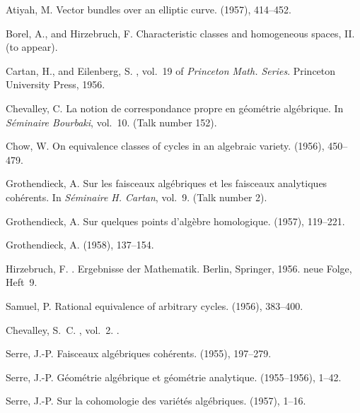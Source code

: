 \documentclass{article}
\theoremstyle{plain}
\theoremstyle{definition}
\begin{document}
\begin{thebibliography}{10}

  {\sc Atiyah, M.}
  \newblock Vector bundles over an elliptic curve.
   (1957), 414--452.

  {\sc Borel, A., and Hirzebruch, F.}
  \newblock Characteristic classes and homogeneous spaces, {II}.
   (to appear).

  {\sc Cartan, H., and Eilenberg, S.}
  , vol.~19 of {\em Princeton Math. Series}.
  \newblock Princeton University Press, 1956.

  {\sc Chevalley, C.}
  \newblock La notion de correspondance propre en g\'{e}om\'{e}trie alg\'{e}brique.
  \newblock In {\em S\'{e}minaire Bourbaki}, vol.~10.
  \newblock (Talk number 152).

  {\sc Chow, W.}
  \newblock On equivalence classes of cycles in an algebraic variety.
   (1956), 450--479.

  {\sc Grothendieck, A.}
  \newblock Sur les faisceaux alg\'{e}briques et les faisceaux analytiques
    coh\'{e}rents.
  \newblock In {\em S\'{e}minaire H. Cartan}, vol.~9.
  \newblock (Talk number 2).

  {\sc Grothendieck, A.}
  \newblock Sur quelques points d'alg\`{e}bre homologique.
   (1957), 119--221.

  {\sc Grothendieck, A.}
   (1958), 137--154.

  {\sc Hirzebruch, F.}
  .
  \newblock Ergebnisse der Mathematik. Berlin, Springer, 1956.
  \newblock neue Folge, Heft~9.

  {\sc Samuel, P.}
  \newblock Rational equivalence of arbitrary cycles.
   (1956), 383--400.

  {\sc Chevalley, S.~C.}
  , vol.~2.
  .

  {\sc Serre, J.-P.}
  \newblock Faisceaux alg\'{e}briques coh\'{e}rents.
   (1955), 197--279.

  {\sc Serre, J.-P.}
  \newblock G\'{e}om\'{e}trie alg\'{e}brique et g\'{e}om\'{e}trie analytique.
   (1955--1956), 1--42.

  {\sc Serre, J.-P.}
  \newblock Sur la cohomologie des vari\'{e}t\'{e}s alg\'{e}briques.
   (1957), 1--16.

\end{thebibliography}
\end{document}
